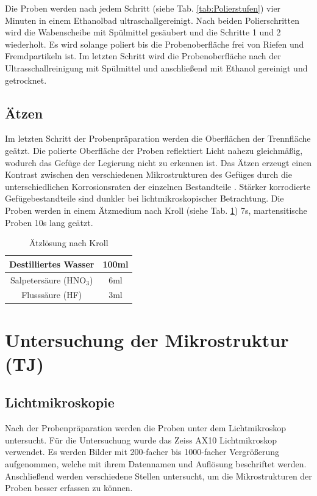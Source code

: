 Die Proben werden nach jedem Schritt (siehe Tab. \ref{tab:Polierstufen}) vier Minuten in einem Ethanolbad ultraschallgereinigt. Nach beiden Polierschritten wird die Wabenscheibe mit Spülmittel gesäubert und die Schritte 1 und 2 wiederholt. Es wird solange poliert bis die Probenoberfläche frei von Riefen und Fremdpartikeln ist. Im letzten Schritt wird die Probenoberfläche nach der Ultrasschallreinigung mit Spülmittel und anschließend mit Ethanol gereinigt und getrocknet. 



\subsection*{Ätzen}

Im letzten Schritt der Probenpräparation werden die Oberflächen der Trennfläche geätzt. Die polierte Oberfläche der Proben reflektiert Licht nahezu gleichmäßig, wodurch das Gefüge der Legierung nicht zu erkennen ist. Das Ätzen erzeugt einen Kontrast zwischen den verschiedenen Mikrostrukturen des Gefüges durch die unterschiedlichen Korrosionsraten der einzelnen Bestandteile \cite{Lutjering.2007}. Stärker korrodierte Gefügebestandteile sind dunkler bei lichtmikroskopischer Betrachtung.
Die Proben werden in einem Ätzmedium nach Kroll (siehe Tab. \ref{tab:Ätz_Kroll}) 7s, martensitische Proben 10s lang geätzt. 

\begin{table}
	\centering
	\begin{tabular}{|c|c|}
		
		\hline 
		Destilliertes Wasser
		& 100ml
		\\ 
		\hline 
		Salpetersäure (HNO$_{3}$)	& 6ml
		\\ 
		\hline 
		Flusssäure (HF) & 3ml
		\\ 
		\hline 
	\end{tabular} 
	\caption{Ätzlösung nach Kroll}
	\label{tab:Ätz_Kroll}
\end{table}

\section{Untersuchung der Mikrostruktur (TJ)}

\subsection*{Lichtmikroskopie}

Nach der Probenpräparation werden die Proben unter dem Lichtmikroskop untersucht. Für die Untersuchung wurde das Zeiss AX10 Lichtmikroskop verwendet. Es werden Bilder mit 200-facher bis 1000-facher Vergrößerung aufgenommen, welche mit ihrem Datennamen und Auflösung beschriftet werden. Anschließend werden verschiedene Stellen untersucht, um die Mikrostrukturen der Proben besser erfassen zu können.

